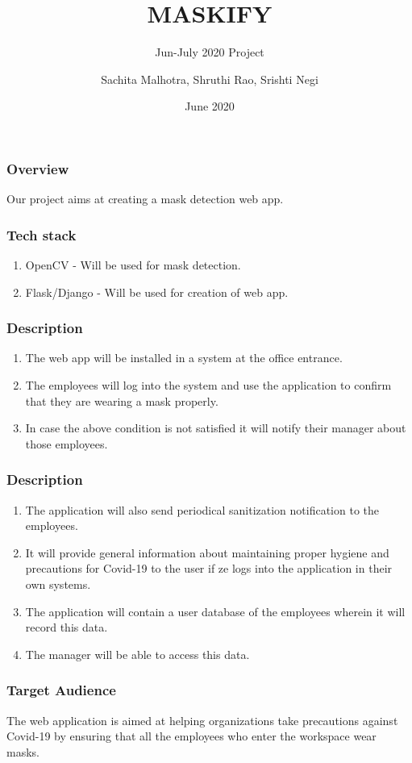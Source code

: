 \documentclass[14pt]{beamer}
\title{MASKIFY}
\subtitle{Jun-July 2020 Project}
\author[TEAM 6]{Sachita Malhotra, Shruthi Rao, Srishti Negi}
\date{June 2020}
\newcounter{saveenumerate}
\newcommand{\saveenumerate}{\setcounter{saveenumerate}{\value{enumi}}}
\newcommand{\restartenumerate}{\setcounter{enumi}{\value{saveenumerate}}}
\begin{document}
\begin{frame}
    \titlepage
\end{frame}

\begin{frame}
    \frametitle{Overview}
    Our project aims at creating a mask detection web app.
\end{frame}

\begin{frame}
    \frametitle{Tech stack}
    \begin{enumerate}
        \item OpenCV - Will be used for mask detection.
        \item Flask/Django - Will be used for creation of web app.
    \end{enumerate}
\end{frame} 

\begin{frame}
    \frametitle{Description}
    \begin{enumerate}
        \item The web app will be installed in a system at the office entrance.

        \item The employees will log into the system and use the application to confirm that they are wearing a mask properly.

        \item In case the above condition is not satisfied it will notify their manager about those employees.
        \saveenumerate
    \end{enumerate}
\end{frame}

\begin{frame}
    \frametitle{Description}
    \begin{enumerate}
        \restartenumerate
        \item The application will also send periodical sanitization notification to the employees.
            
        \item It will provide general information about maintaining proper hygiene and precautions for Covid-19 to the user if ze logs into the application in their own systems.
        
        \item The application will contain a user database of the employees wherein it will record this data.
        
        \item The manager will be able to access this data.
    \end{enumerate}
\end{frame}

\begin{frame}
    \frametitle{Target Audience}
    The web application is  aimed at helping organizations take precautions against Covid-19 by ensuring that all the employees who enter the workspace wear masks.
\end{frame}
\end{document}
